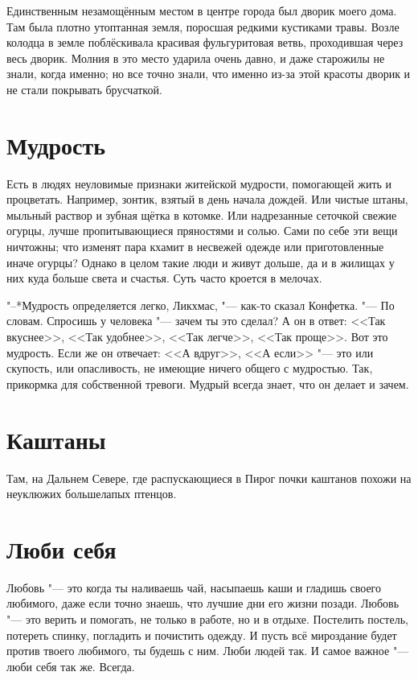 Единственным незамощённым местом в центре города был дворик моего дома.
Там была плотно утоптанная земля, поросшая редкими кустиками травы.
Возле колодца в земле поблёскивала красивая фульгуритовая ветвь, проходившая через весь дворик.
Молния в это место ударила очень давно, и даже старожилы не знали, когда именно;
но все точно знали, что именно из-за этой красоты дворик и не стали покрывать брусчаткой.

\section{Мудрость}

Есть в людях неуловимые признаки житейской мудрости, помогающей жить и процветать.
Например, зонтик, взятый в день начала дождей.
Или чистые штаны, мыльный раствор и зубная щётка в котомке.
Или надрезанные сеточкой свежие огурцы, лучше пропитывающиеся пряностями и солью.
Сами по себе эти вещи ничтожны;
что изменят пара кхамит в несвежей одежде или приготовленные иначе огурцы?
Однако в целом такие люди и живут дольше, да и в жилищах у них куда больше света и счастья.
Суть часто кроется в мелочах.

"--*Мудрость определяется легко, Ликхмас, "--- как-то сказал Конфетка.
"--- По словам.
Спросишь у человека "--- зачем ты это сделал?
А он в ответ: <<Так вкуснее>>, <<Так удобнее>>, <<Так легче>>, <<Так проще>>.
Вот это мудрость.
Если же он отвечает: <<А вдруг>>, <<А если>> "--- это или скупость, или опасливость, не имеющие ничего общего с мудростью.
Так, прикормка для собственной тревоги.
Мудрый всегда знает, что он делает и зачем.

\section{Каштаны}

Там, на Дальнем Севере, где распускающиеся в Пирог почки каштанов похожи на неуклюжих большелапых птенцов.

\section{Люби себя}

Любовь "--- это когда ты наливаешь чай, насыпаешь каши и гладишь своего любимого, даже если точно знаешь, что лучшие дни его жизни позади.
Любовь "--- это верить и помогать, не только в работе, но и в отдыхе.
Постелить постель, потереть спинку, погладить и почистить одежду.
И пусть всё мироздание будет против твоего любимого, ты будешь с ним.
Люби людей так.
И самое важное "--- люби себя так же.
Всегда.

